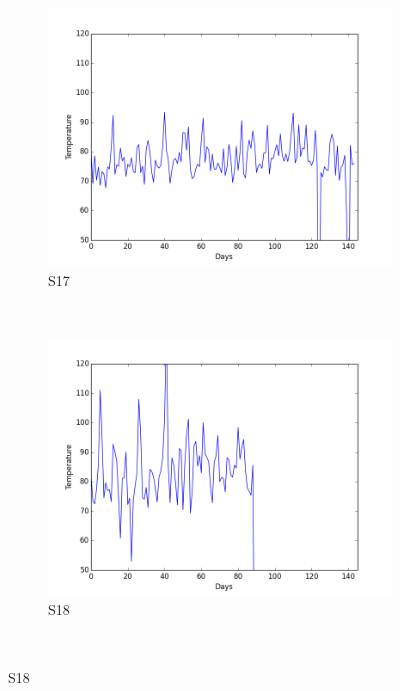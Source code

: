 \documentclass[12pt]{article} %
\begin{document}
\begin{figure}[H]
    \begin{subfigure}[b]{0.2\textwidth}
        \includegraphics[width=\textwidth]{img/graphs/17-heartrate-1}
        \caption{S17}
        \label{fig:s17HT}
    \end{subfigure}
    ~ %
    \begin{subfigure}[b]{0.2\textwidth}
        \includegraphics[width=\textwidth]{img/graphs/18-heartrate-1}
        \caption{S18}
        \label{fig:s18HT}
    \end{subfigure}
    ~ %

\end{figure}
\end{document}
